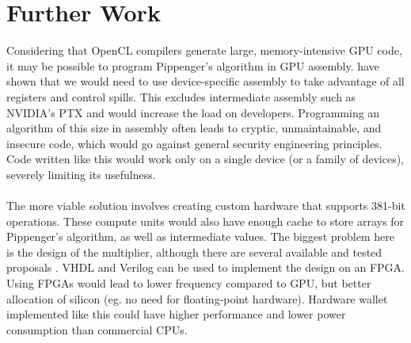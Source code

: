 
\chapter{Further Work} %

\label{Chapter8} %


Considering that OpenCL compilers generate large, memory-intensive GPU code, it may be possible to program Pippenger's algorithm in GPU assembly. \cite{bernstein2010ecc2k} have shown that we would need to use device-specific assembly to take advantage of all registers and control spills. This excludes intermediate assembly such as NVIDIA's PTX and would increase the load on developers. Programming an algorithm of this size in assembly often leads to cryptic, unmaintainable, and insecure code, which would go against general security engineering principles. Code written like this would work only on a single device (or a family of devices), severely limiting its usefulness.\\
\\
The more viable solution involves creating custom hardware that supports 381-bit operations. These compute units would also have enough cache to store arrays for Pippenger's algorithm, as well as intermediate values. The biggest problem here is the design of the multiplier, although there are several available and tested proposals \cite{brinci2015efficient, quan2005high}. VHDL and Verilog can be used to implement the design on an FPGA. Using FPGAs would lead to lower frequency compared to GPU, but better allocation of silicon (eg. no need for floating-point hardware). Hardware wallet implemented like this could have higher performance and lower power consumption than commercial CPUs.